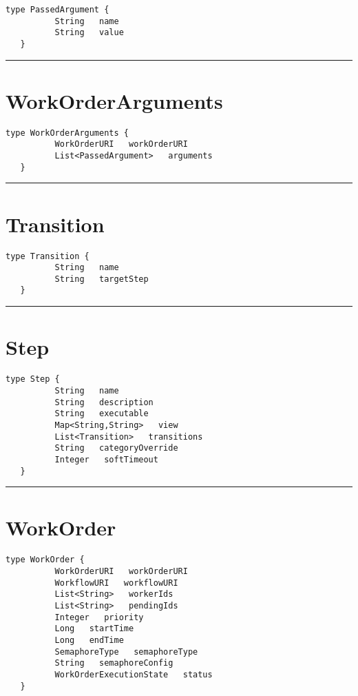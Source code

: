 \begin{lstlisting}[style=nonumbers]
   type PassedArgument {
          String   name
          String   value
   }
\end{lstlisting}

\rule{12cm}{2pt}
\section{WorkOrderArguments}
\label{type:WorkOrderArguments}

\begin{lstlisting}[style=nonumbers]
   type WorkOrderArguments {
          WorkOrderURI   workOrderURI
          List<PassedArgument>   arguments
   }
\end{lstlisting}

\rule{12cm}{2pt}
\section{Transition}
\label{type:Transition}

\begin{lstlisting}[style=nonumbers]
   type Transition {
          String   name
          String   targetStep
   }
\end{lstlisting}

\rule{12cm}{2pt}
\section{Step}
\label{type:Step}

\begin{lstlisting}[style=nonumbers]
   type Step {
          String   name
          String   description
          String   executable
          Map<String,String>   view
          List<Transition>   transitions
          String   categoryOverride
          Integer   softTimeout
   }
\end{lstlisting}

\rule{12cm}{2pt}
\section{WorkOrder}
\label{type:WorkOrder}

\begin{lstlisting}[style=nonumbers]
   type WorkOrder {
          WorkOrderURI   workOrderURI
          WorkflowURI   workflowURI
          List<String>   workerIds
          List<String>   pendingIds
          Integer   priority
          Long   startTime
          Long   endTime
          SemaphoreType   semaphoreType
          String   semaphoreConfig
          WorkOrderExecutionState   status
   }
\end{lstlisting}

